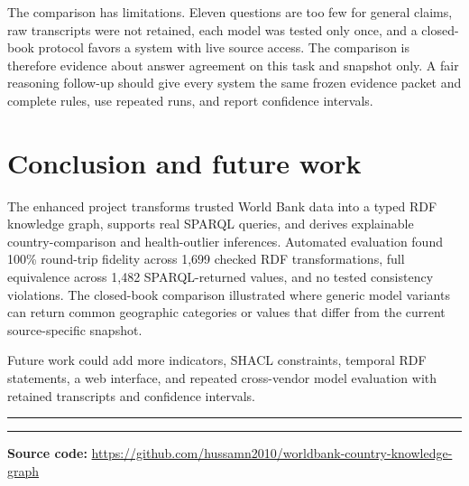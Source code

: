 \documentclass[12pt,a4paper]{article}
\begin{document}
The comparison has limitations. Eleven questions are too few for general claims, raw transcripts were not retained, each model was tested only once, and a closed-book protocol favors a system with live source access. The comparison is therefore evidence about answer agreement on this task and snapshot only. A fair reasoning follow-up should give every system the same frozen evidence packet and complete rules, use repeated runs, and report confidence intervals.

\section*{Conclusion and future work}
The enhanced project transforms trusted World Bank data into a typed RDF knowledge graph, supports real SPARQL queries, and derives explainable country-comparison and health-outlier inferences. Automated evaluation found 100\% round-trip fidelity across 1,699 checked RDF transformations, full equivalence across 1,482 SPARQL-returned values, and no tested consistency violations. The closed-book comparison illustrated where generic model variants can return common geographic categories or values that differ from the current source-specific snapshot.

Future work could add more indicators, SHACL constraints, temporal RDF statements, a web interface, and repeated cross-vendor model evaluation with retained transcripts and confidence intervals.




\vspace{0.5cm}
\hrule
\vspace{0.3em}
\hrule
\vspace{0.5em}
\begin{center}
\textbf{Source code:} \url{https://github.com/hussamn2010/worldbank-country-knowledge-graph}
\end{center}
\end{document}
